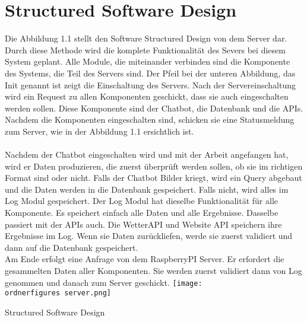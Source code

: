 \section{Structured Software Design}

Die Abbildung 1.1 stellt den Software Structured Design von dem Server dar. Durch diese Methode wird die komplete Funktionalität des Severs bei diesem System geplant. Alle Module, die miteinander verbinden sind die Komponente des Systems, die Teil des Servers sind. 
Der Pfeil bei der unteren Abbildung, das Init genannt ist zeigt die Einschaltung des Servers. Nach der Servereinschaltung wird ein Request zu allen Komponenten geschickt, dass sie auch eingeschalten werden sollen. Diese Komponente sind der Chatbot, die Datenbank und die APIs. 
Nachdem die Komponenten eingeschalten sind, schicken sie eine Statusmeldung zum Server, wie in der Abbildung 1.1 ersichtlich ist. \\
\\
Nachdem der Chatbot eingeschalten wird und mit der Arbeit angefangen hat, wird er Daten produzieren, die zuerst überprüft werden sollen, ob sie im richtigen Format sind oder nicht. Falls der Chatbot Bilder kriegt, wird ein Query abgebaut und die Daten werden in die Datenbank gespeichert. Falls nicht, wird alles im Log Modul gespeichert. Der Log Modul hat dieselbe Funktionalität für alle Komponente. Es speichert einfach alle Daten und alle Ergebnisse.
Dasselbe passiert mit der APIs auch. Die WetterAPI und Website API speichern ihre Ergebnisse im Log. Wenn sie Daten zurückliefen, werde sie zuerst validiert und dann auf die Datenbank gespeichert.\\

Am Ende erfolgt eine Anfrage von dem RaspberryPI Server. Er erfordert die gesammelten Daten aller Komponenten. Sie werden zuerst validiert dann von Log genommen und danach zum Server geschickt.
\captionsetup{type=figure}
\texttt{[image: \\ordnerfigures server.png]}
\caption{Structured Software Design}
\label{fig:ersteebene}
